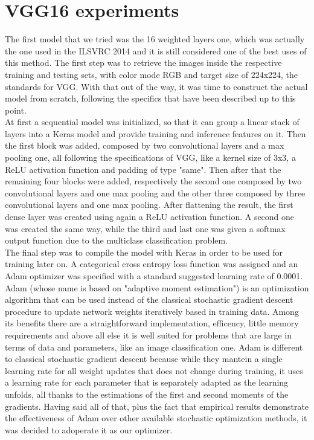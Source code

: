 \documentclass[12pt,a4paper]{report}
\begin{document}
\section{VGG16 experiments}
The first model that we tried was the 16 weighted layers one, which was actually the one used in the ILSVRC 2014 and it is still considered one of the best uses of this method. The first step was to retrieve the images inside the respective training and testing sets, with color mode RGB and target size of 224x224, the standards for VGG. With that out of the way, it was time to construct the actual model from scratch, following the specifics that have been described up to this point. \\
At first a sequential model was initialized, so that it can group a linear stack of layers into a Keras model and provide training and inference features on it. Then the first block was added, composed by two convolutional layers and a max pooling one, all following the specifications of VGG, like a kernel size of 3x3, a ReLU activation function and padding of type "same". Then after that the remaining four blocks were added, respectively the second one composed by two convolutional layers and one max pooling and the other three composed by three convolutional layers and one max pooling. After flattening the result, the first dense layer was created using again a ReLU activation function. A second one was created the same way, while the third and last one was given a softmax output function due to the multiclass classification problem. \\
The final step was to compile the model with Keras in order to be used for training later on. A categorical cross entropy loss function was assigned and an Adam optimizer was specified with a standard suggested learning rate of 0.0001. Adam (whose name is based on "adaptive moment estimation") is an optimization algorithm that can be used instead of the classical stochastic gradient descent procedure to update network weights iteratively based in training data. Among its benefits there are a straightforward implementation, efficency, little memory requirements and above all else it is well suited for problems that are large in terms of data and parameters, like an image classification one. Adam is different to classical stochastic gradient descent because while they mantein a single learning rate for all weight updates that does not change during training, it uses a learning rate for each parameter that is separately adapted as the learning unfolds, all thanks to the estimations of the first and second moments of the gradients. Having said all of that, plus the fact that empirical results demonstrate the effectiveness of Adam over other available stochastic optimization methods, it was decided to adoperate it as our optimizer. \\
\end{document}
